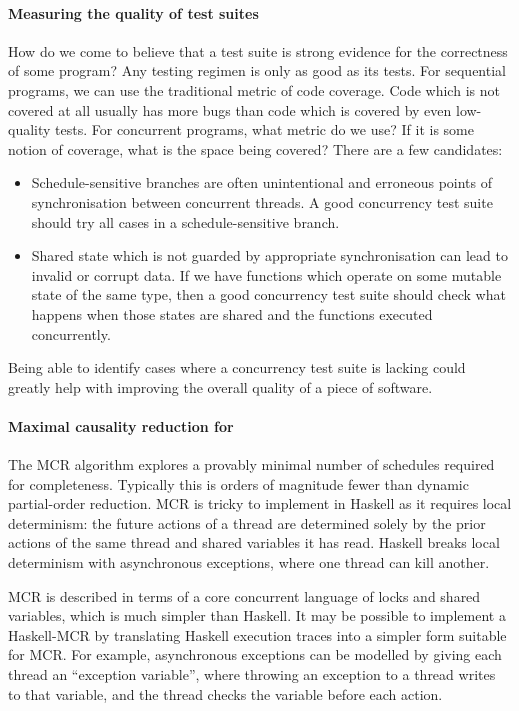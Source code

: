 \paragraph{Measuring the quality of test suites}
How do we come to believe that a test suite is strong evidence for the
correctness of some program?  Any testing regimen is only as good as
its tests.  For sequential programs, we can use the traditional metric
of code coverage.  Code which is not covered at all usually has more
bugs than code which is covered by even low-quality
tests\cite{ahmed2016}.  For concurrent programs, what metric do we
use?  If it is some notion of coverage, what is the space being
covered?  There are a few candidates:

\begin{itemize}
\item Schedule-sensitive branches are often unintentional and
  erroneous points of synchronisation between concurrent
  threads\cite{huang2015ssb}.  A good concurrency test suite should
  try all cases in a schedule-sensitive branch.

\item Shared state which is not guarded by appropriate synchronisation
  can lead to invalid or corrupt data.  If we have functions which
  operate on some mutable state of the same type, then a good
  concurrency test suite should check what happens when those states
  are shared and the functions executed concurrently.
\end{itemize}

Being able to identify cases where a concurrency test suite is lacking
could greatly help with improving the overall quality of a piece of
software.

\paragraph{Maximal causality reduction for \dejafu{}}
The MCR algorithm\cite{huang2015} explores a provably minimal number
of schedules required for completeness.  Typically this is orders of
magnitude fewer than dynamic partial-order reduction.  MCR is tricky
to implement in Haskell as it requires local determinism: the future
actions of a thread are determined solely by the prior actions of the
same thread and shared variables it has read.  Haskell breaks local
determinism with asynchronous exceptions, where one thread can kill
another.

MCR is described in terms of a core concurrent language of locks and
shared variables, which is much simpler than Haskell.  It may be
possible to implement a Haskell-MCR by translating Haskell execution
traces into a simpler form suitable for MCR\@.  For example,
asynchronous exceptions can be modelled by giving each thread an
``exception variable'', where throwing an exception to a thread writes
to that variable, and the thread checks the variable before each
action.

